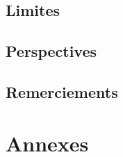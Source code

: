 \documentclass[compress,9pt]{beamer}
\begin{document}
	\subsection{Limites}
	\subsection{Perspectives}
	\subsection{Remerciements}
	
	
\section{Annexes}



\end{document}
